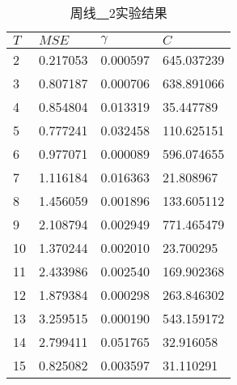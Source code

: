 \begin{table}[ht]
    \centering
    \caption{周线\underline{~~}2实验结果}
    \begin{tabular}{llll}
        \hline
        $T$&     $MSE$ &  $\gamma$ &         $C$ \\
        \hline
         2 &  0.217053 &  0.000597 &  645.037239 \\
         3 &  0.807187 &  0.000706 &  638.891066 \\
         4 &  0.854804 &  0.013319 &   35.447789 \\
         5 &  0.777241 &  0.032458 &  110.625151 \\
         6 &  0.977071 &  0.000089 &  596.074655 \\
         7 &  1.116184 &  0.016363 &   21.808967 \\
         8 &  1.456059 &  0.001896 &  133.605112 \\
         9 &  2.108794 &  0.002949 &  771.465479 \\
        10 &  1.370244 &  0.002010 &   23.700295 \\
        11 &  2.433986 &  0.002540 &  169.902368 \\
        12 &  1.879384 &  0.000298 &  263.846302 \\
        13 &  3.259515 &  0.000190 &  543.159172 \\
        14 &  2.799411 &  0.051765 &   32.916058 \\
        15 &  0.825082 &  0.003597 &   31.110291 \\
        \hline
    \end{tabular}
\end{table}